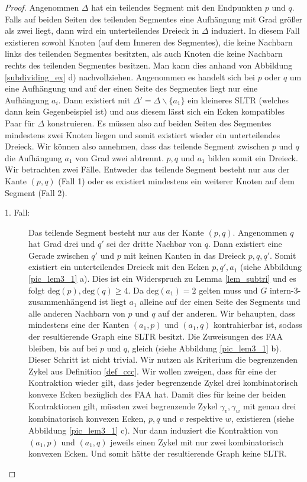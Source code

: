 \begin{proof}
Angenommen $\Delta$ hat ein teilendes Segment mit den Endpunkten $p$ und $q$. Falls auf beiden Seiten des teilenden Segmentes eine Aufhängung mit Grad größer als zwei liegt, dann wird ein unterteilendes Dreieck in $\Delta$ induziert. In diesem Fall existieren sowohl Knoten (auf dem Inneren des Segmentes), die keine Nachbarn links des teilenden Segmentes besitzten, als auch Knoten die keine Nachbarn rechts des teilenden Segmentes besitzen. Man kann dies anhand von Abbildung \ref{subdividing_ex} d) nachvollziehen. Angenommen es handelt sich bei $p$ oder $q$ um eine Aufhängung und auf der einen Seite des Segmentes liegt nur eine Aufhängung $a_i$. Dann existiert mit $\Delta' = \Delta \backslash \{a_1\}$ ein kleineres SLTR (welches dann kein Gegenbeispiel ist) und aus diesem lässt sich ein Ecken kompatibles Paar für $\Delta$ konstruieren. Es müssen also auf beiden Seiten des Segmentes mindestens zwei Knoten liegen und somit existiert wieder ein unterteilendes Dreieck. Wir können also annehmen, dass das teilende Segment zwischen $p$ und $q$ die Aufhängung $a_1$ von Grad zwei abtrennt. $p,q$ und $a_1$ bilden somit ein Dreieck. Wir betrachten zwei Fälle. Entweder das teilende Segment besteht nur aus der Kante $(p,q)$ (Fall 1) oder es existiert mindestens ein weiterer Knoten auf dem Segment (Fall 2).

\begin{description}
\item[1. Fall:] Das teilende Segment besteht nur aus der Kante $(p,q)$. Angenommen $q$ hat Grad drei und $q'$ sei der dritte Nachbar von $q$. Dann existiert eine Gerade zwischen $q'$ und $p$ mit keinen Kanten in das Dreieck $p,q,q'$. Somit existiert ein unterteilendes Dreieck mit den Ecken $p,q',a_1$ (siehe Abbildung \ref{pic_lem3_1} a). Dies ist ein Widerspruch zu Lemma \ref{lem_subtri} und es folgt $\text{deg}(p),\text{deg}(q) \geq 4$. Da $\text{deg}(a_1) = 2$ gelten muss und $G$ intern-3-zusammenhängend ist liegt $a_1$ alleine auf der einen Seite des Segments und alle anderen Nachbarn von $p$ und $q$ auf der anderen. 
Wir behaupten, dass mindestens eine der Kanten $(a_1,p)$ und $(a_1,q)$ kontrahierbar ist, sodass der resultierende Graph eine SLTR besitzt. Die Zuweisungen des FAA bleiben, bis auf bei $p$ und $q$, gleich (siehe Abbildung \ref{pic_lem3_1} b). Dieser Schritt ist nicht trivial. Wir nutzen als Kriterium die begrenzenden Zykel aus Definition \ref{def_ccc}. Wir wollen zweigen, dass für eine der Kontraktion wieder gilt, dass jeder begrenzende Zykel drei kombinatorisch konvexe Ecken bezüglich des FAA hat. Damit dies für keine der beiden Kontraktionen gilt, müssten zwei begrenzende Zykel $\gamma_v,\gamma_w$ mit genau drei kombinatorisch konvexen Ecken, $p,q$ und $v$ respektive $w$, existieren (siehe Abbildung \ref{pic_lem3_1} c). Nur dann induziert die Kontraktion von $(a_1,p)$ und $(a_1,q)$ jeweils einen Zykel mit nur zwei kombinatorisch konvexen Ecken. Und somit hätte der resultierende Graph keine SLTR.


\end{description}
\end{proof}
